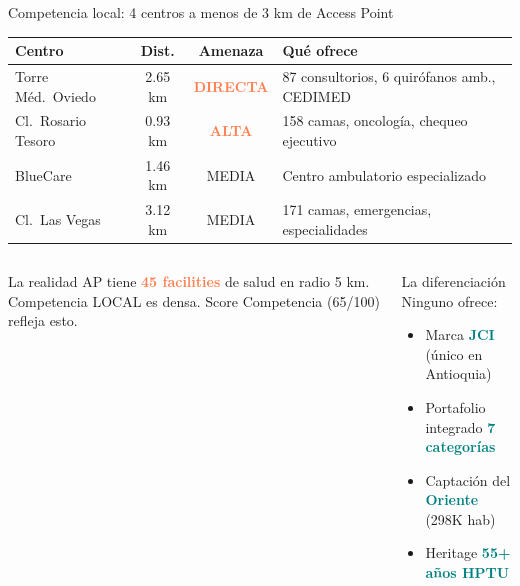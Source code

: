 \documentclass[aspectratio=169, 11pt]{beamer}
\newcommand{\highlight}[1]{\textcolor{teal}{\textbf{#1}}}
\newcommand{\danger}[1]{\textcolor{coral}{\textbf{#1}}}
\newcommand{\src}[1]{\par\vspace{2pt}{\tiny\textcolor{slate}{Fuente: #1}}}
\begin{document}

\begin{frame}{Competencia local: 4 centros a menos de 3 km de Access Point}
\vspace{-4pt}
\begin{center}
{\scriptsize
\begin{tabular}{@{}p{3cm}ccp{4.5cm}@{}}
\toprule
\textbf{Centro} & \textbf{Dist.} & \textbf{Amenaza} & \textbf{Qué ofrece} \\
\midrule
\rowcolor{coral!10}
Torre Méd.\ Oviedo & 2.65 km & \danger{DIRECTA} & 87 consultorios, 6 quirófanos amb., CEDIMED \\
Cl.\ Rosario Tesoro & 0.93 km & \danger{ALTA} & 158 camas, oncología, chequeo ejecutivo \\
\rowcolor{coral!6}
BlueCare & 1.46 km & MEDIA & Centro ambulatorio especializado \\
Cl.\ Las Vegas & 3.12 km & MEDIA & 171 camas, emergencias, especialidades \\
\bottomrule
\end{tabular}
}
\end{center}

\vspace{2pt}
\begin{columns}[T]
\begin{alertblock}{\small La realidad}
\scriptsize
AP tiene \danger{45 facilities} de salud en radio 5 km. Competencia LOCAL es densa. Score Competencia (65/100) refleja esto.
\end{alertblock}

\begin{exampleblock}{\small La diferenciación}
\scriptsize
Ninguno ofrece:
\begin{itemize}\setlength{\itemsep}{0pt}
  \item Marca \highlight{JCI} (único en Antioquia)
  \item Portafolio integrado \highlight{7 categorías}
  \item Captación del \highlight{Oriente} (298K hab)
  \item Heritage \highlight{55+ años HPTU}
\end{itemize}
\end{exampleblock}
\end{columns}
\src{Google Places API, OSM Overpass, REPS (b4dp-ximh)}
\end{frame}
\end{document}
